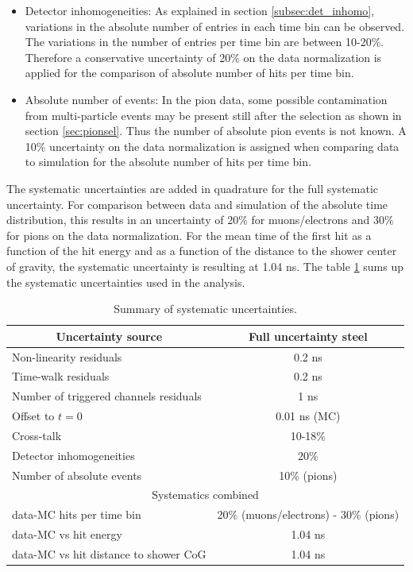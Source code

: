 \begin{itemize}
	\item Detector inhomogeneities: As explained in section \ref{subsec:det_inhomo}, variations in the absolute number of entries in each time bin can be observed. The variations in the number of entries per time bin are between 10-20\%. Therefore a conservative uncertainty of 20\% on the data normalization is applied for the comparison of absolute number of hits per time bin.
	\item Absolute number of events: In the pion data, some possible contamination from multi-particle events may be present still after the selection as shown in section \ref{sec:pionsel}. Thus the number of absolute pion events is not known. A 10\% uncertainty on the data normalization is assigned when comparing data to simulation for the absolute number of hits per time bin.
\end{itemize}

The systematic uncertainties are added in quadrature for the full systematic uncertainty. For comparison between data and simulation of the absolute time distribution, this results in an uncertainty of 20\% for muons/electrons and 30\% for pions on the data normalization. For the mean time of the first hit as a function of the hit energy and as a function of the distance to the shower center of gravity, the systematic uncertainty is resulting at 1.04 ns. The table \ref{table:time_syst} sums up the systematic uncertainties used in the analysis.
{
\renewcommand{\arraystretch}{1.2}
\begin{table}[htb!]
	\centering
	\caption{Summary of systematic uncertainties.}
	\label{table:time_syst}
	\begin{tabular}{@{} lc @{}}
		\toprule
		\multicolumn{1}{c}{Uncertainty source} & Full uncertainty steel \\
		\midrule
		Non-linearity residuals & 0.2 ns \\
		Time-walk residuals & 0.2 ns \\
		Number of triggered channels residuals & 1 ns \\
		Offset to $t=0$ & 0.01 ns (MC) \\
		Cross-talk & 10-18\% \\
		Detector inhomogeneities & 20\% \\
		Number of absolute events & 10\% (pions) \\
		\midrule
		\midrule
		\multicolumn{2}{c}{Systematics combined} \\
		\midrule
		data-MC hits per time bin & 20\% (muons/electrons) - 30\% (pions) \\
		data-MC vs hit energy & 1.04 ns \\
		data-MC vs hit distance to shower CoG & 1.04 ns \\
		\bottomrule
	\end{tabular}
\end{table}
}

